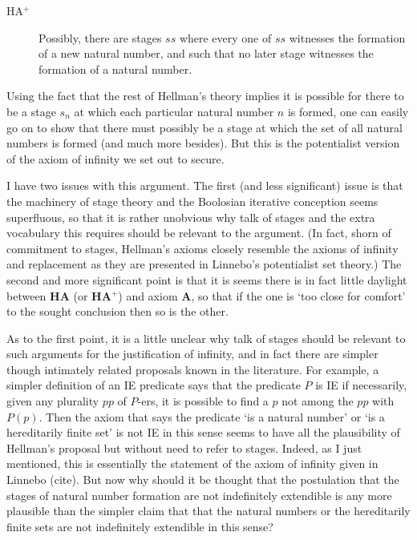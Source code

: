 \documentclass{amsart}
\theoremstyle{definition}
\begin{document}
\begin{description}
    \item[HA$^+$] Possibly, there are stages $ss$ 
    where every one of $ss$ witnesses the formation of a new natural number, 
    and such that no later stage witnesses the formation of a natural number.
\end{description}

Using the fact that the rest of Hellman's theory implies 
it is possible for there to be a stage $s_n$ at which 
each particular natural number $n$ is formed, 
one can easily go on to show that there must possibly be a stage 
at which the set of all natural numbers is formed (and much more besides). 
But this is the potentialist version of the axiom of infinity we set out to secure.

I have two issues with this argument. 
The first (and less significant) issue is that the machinery of stage theory 
and the Boolosian iterative conception seems superfluous, so that it is 
rather unobvious why talk of stages and the extra vocabulary this requires should 
be relevant to the argument. (In fact, shorn of commitment to stages, Hellman's 
axioms closely resemble the axioms of infinity and replacement as they are 
presented in Linnebo's potentialist set theory.) 
The second and more significant point is that it is seems there is in fact 
little daylight between {\bf HA} (or {\bf HA$^+$})
and axiom {\bf A}, so that if the one is  `too close for comfort' to the 
sought conclusion then so is the other.

As to the first point, it is a little unclear why talk of stages 
should be relevant to such arguments for the justification of infinity, 
and in fact there are simpler though intimately related proposals known 
in the literature. For example, a simpler definition of an IE predicate says 
that the predicate $P$ is IE if necessarily, given any plurality $pp$ of $P$-ers, 
it is possible to find a $p$ not among the $pp$ with $P(p)$. 
Then the axiom that says the predicate `is a natural number' or 
`is a hereditarily finite set' is not IE in this sense seems to have 
all the plausibility of Hellman's proposal but without need to refer to stages. 
Indeed, as I just mentioned, this is essentially the statement of the axiom
of infinity given in Linnebo (cite). But now why should it be thought that the postulation
that the stages of natural number formation are not indefinitely extendible is any 
more plausible than the simpler claim that that the natural numbers or the hereditarily 
finite sets are not indefinitely extendible in this sense?
\end{document}
